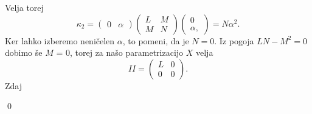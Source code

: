 Velja torej \begin{equation*}
  \kappa_2 = \begin{pmatrix}
      0 & \alpha
  \end{pmatrix} \begin{pmatrix}
  L & M \\
  M & N
  \end{pmatrix} \begin{pmatrix}
    0 \\ \alpha,
  \end{pmatrix} = N \alpha^2.
\end{equation*}
Ker lahko izberemo neničelen $\alpha$, to pomeni, da je $N = 0.$ Iz pogoja $LN - M^2 = 0$ dobimo še $M$ = 0, torej za našo parametrizacijo $X$ velja \begin{equation*}
II = \begin{pmatrix}
L & 0 \\
0 & 0
\end{pmatrix}.
\end{equation*}  
Zdaj   

\qed